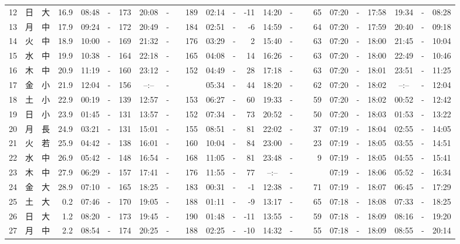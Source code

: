\documentclass[12pt,a4j]{jsarticle}
\begin{document}
\begin{table}[htbp]
\begin{center}
{\begin{tabular}{|rc|cr|ccrccr|ccrccr|ccc|ccc|}
12 & 日 & 大 & 16.9 &  08:48 &-& 173 &  20:08 &-& 189 &  02:14 &-& -11 &  14:20 &-&  65 & 07:20 & -& 17:58 & 19:34 & -& 08:28 \\
13 & 月 & 中 & 17.9 &  09:24 &-& 172 &  20:49 &-& 184 &  02:51 &-&  -6 &  14:59 &-&  64 & 07:20 & -& 17:59 & 20:40 & -& 09:18 \\
14 & 火 & 中 & 18.9 &  10:00 &-& 169 &  21:32 &-& 176 &  03:29 &-&   2 &  15:40 &-&  63 & 07:20 & -& 18:00 & 21:45 & -& 10:04 \\
15 & 水 & 中 & 19.9 &  10:38 &-& 164 &  22:18 &-& 165 &  04:08 &-&  14 &  16:26 &-&  63 & 07:20 & -& 18:00 & 22:49 & -& 10:46 \\
16 & 木 & 中 & 20.9 &  11:19 &-& 160 &  23:12 &-& 152 &  04:49 &-&  28 &  17:18 &-&  63 & 07:20 & -& 18:01 & 23:51 & -& 11:25 \\
17 & 金 & 小 & 21.9 &  12:04 &-& 156 &  --:-- &-&~~~~~ &  05:34 &-&  44 &  18:20 &-&  62 & 07:20 & -& 18:02 & --:-- & -& 12:04 \\
18 & 土 & 小 & 22.9 &  00:19 &-& 139 &  12:57 &-& 153 &  06:27 &-&  60 &  19:33 &-&  59 & 07:20 & -& 18:02 & 00:52 & -& 12:42 \\
19 & 日 & 小 & 23.9 &  01:45 &-& 131 &  13:57 &-& 152 &  07:34 &-&  73 &  20:52 &-&  50 & 07:20 & -& 18:03 & 01:53 & -& 13:22 \\
20 & 月 & 長 & 24.9 &  03:21 &-& 131 &  15:01 &-& 155 &  08:51 &-&  81 &  22:02 &-&  37 & 07:19 & -& 18:04 & 02:55 & -& 14:05 \\
21 & 火 & 若 & 25.9 &  04:42 &-& 138 &  16:01 &-& 160 &  10:04 &-&  84 &  23:00 &-&  23 & 07:19 & -& 18:05 & 03:55 & -& 14:51 \\
22 & 水 & 中 & 26.9 &  05:42 &-& 148 &  16:54 &-& 168 &  11:05 &-&  81 &  23:48 &-&   9 & 07:19 & -& 18:05 & 04:55 & -& 15:41 \\
23 & 木 & 中 & 27.9 &  06:29 &-& 157 &  17:41 &-& 176 &  11:55 &-&  77 &  --:-- &-&~~~~~ & 07:19 & -& 18:06 & 05:52 & -& 16:34 \\
24 & 金 & 大 & 28.9 &  07:10 &-& 165 &  18:25 &-& 183 &  00:31 &-&  -1 &  12:38 &-&  71 & 07:19 & -& 18:07 & 06:45 & -& 17:29 \\
25 & 土 & 大 &  0.2 &  07:46 &-& 170 &  19:05 &-& 188 &  01:11 &-&  -9 &  13:17 &-&  65 & 07:18 & -& 18:08 & 07:33 & -& 18:25 \\
26 & 日 & 大 &  1.2 &  08:20 &-& 173 &  19:45 &-& 190 &  01:48 &-& -11 &  13:55 &-&  59 & 07:18 & -& 18:09 & 08:16 & -& 19:20 \\
27 & 月 & 中 &  2.2 &  08:54 &-& 174 &  20:25 &-& 188 &  02:25 &-& -10 &  14:32 &-&  55 & 07:18 & -& 18:09 & 08:55 & -& 20:14 \\

\end{tabular}}
\end{center}
\end{table}
\end{document}
